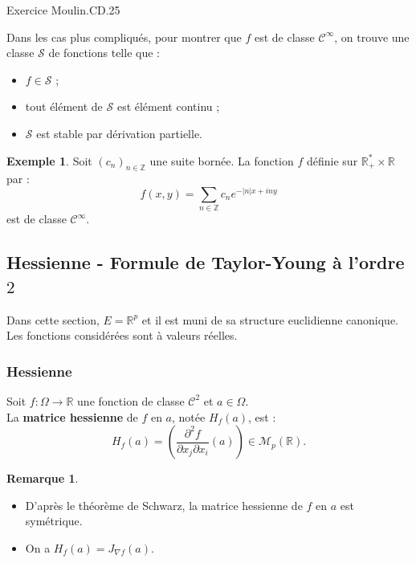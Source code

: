 \documentclass[french]{article}
\newcommand{\Z}{\mathbb{Z}}
\newcommand{\R}{\mathbb{R}}
\newcommand{\st}{^*}
\theoremstyle{plain}
\theoremstyle{definition}
\newtheorem*{ex}{Exemple}
\newtheorem*{rmq}{Remarque}
\theoremstyle{remark}
\begin{document}
Exercice Moulin.CD.25

\begin{met}
	Dans les cas plus compliqués, pour montrer que $f$ est de classe $\mathcal{C}^\infty$, on trouve une classe $\mathcal{S}$ de fonctions telle que :
	\begin{itemize}
		\item $f\in \mathcal{S}$ ;
		\item tout élément de $\mathcal{S}$ est élément continu ;
		\item $\mathcal{S}$ est stable par dérivation partielle.
	\end{itemize}
\end{met}

\begin{ex}
	Soit $(c_n)_{n\in\Z}$ une suite bornée. La fonction $f$ définie sur $\R_+\st\times\R$ par :
	$$f(x,y)=\sum_{n\in\Z}c_ne^{-\lvert n\rvert x+iny}$$ est de classe $\mathcal{C}^\infty$.
\end{ex}

\subsection{Hessienne - Formule de Taylor-Young à l'ordre $2$}

Dans cette section, $E=\R^p$ et il est muni de sa structure euclidienne canonique. Les fonctions considérées sont à valeurs réelles.

\subsubsection*{Hessienne}

\begin{dfn}
	Soit $f:\Omega\to\R$ une fonction de classe $\mathcal{C}^2$ et $a\in\Omega$.\\
	La \textbf{matrice hessienne} de $f$ en $a$, notée $H_f(a)$, est :
	$$H_f(a)=\left(\frac{\partial^2f}{\partial x_j\partial x_i}(a)\right)\in\mathcal{M}_p(\R).$$
\end{dfn}

\begin{rmq}
	\begin{itemize}
		\item D'après le théorème de Schwarz, la matrice hessienne de $f$ en $a$ est symétrique.
		\item On a $H_f(a)=J_{\nabla f}(a)$.
	\end{itemize}
\end{rmq}
\end{document}
